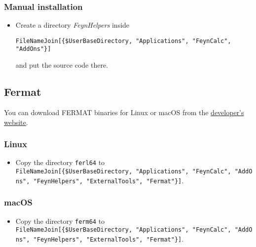 \documentclass[../FeynHelpersManual.tex]{subfiles}
\begin{document}
\hypertarget{manual-installation}{%
\subsubsection{Manual installation}\label{manual-installation}}

\begin{itemize}
\item
  Create a directory \emph{FeynHelpers} inside

\begin{verbatim}
FileNameJoin[{$UserBaseDirectory, "Applications", "FeynCalc", "AddOns"}]
\end{verbatim}

  and put the source code there.
\end{itemize}

\hypertarget{fermat}{%
\subsection{Fermat}\label{fermat}}

You can download FERMAT binaries for Linux or macOS from the
\href{https://home.bway.net/lewis/zip.html}{developer's website}.

\hypertarget{linux}{%
\subsubsection{Linux}\label{linux}}

\begin{itemize}
\tightlist
\item
  Copy the directory \texttt{ferl64} to
  \texttt{FileNameJoin[\allowbreak{}\{\allowbreak{}\$UserBaseDirectory,\ \allowbreak{}"Applications",\ \allowbreak{}"FeynCalc",\ \allowbreak{}"AddOns",\ \allowbreak{}"FeynHelpers",\ \allowbreak{}"ExternalTools",\ \allowbreak{}"Fermat"\}]}.
\end{itemize}

\hypertarget{macos}{%
\subsubsection{macOS}\label{macos}}

\begin{itemize}
\tightlist
\item
  Copy the directory \texttt{ferm64} to
  \texttt{FileNameJoin[\allowbreak{}\{\allowbreak{}\$UserBaseDirectory,\ \allowbreak{}"Applications",\ \allowbreak{}"FeynCalc",\ \allowbreak{}"AddOns",\ \allowbreak{}"FeynHelpers",\ \allowbreak{}"ExternalTools",\ \allowbreak{}"Fermat"\}]}.
\end{itemize}
\end{document}
